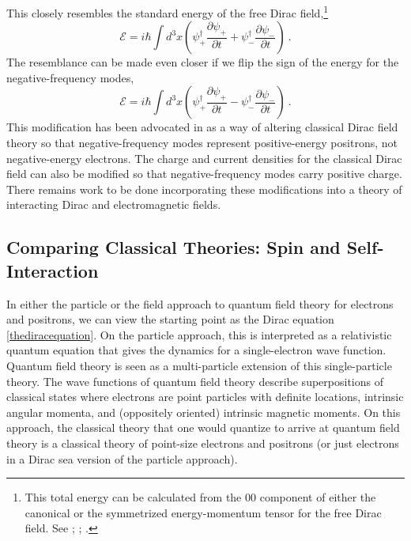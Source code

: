 \documentclass[onecolumn,secnumarabic,amsmath,amssymb,balancelastpage,nofootinbib,12pt]{article}
\begin{document}
This closely resembles the standard energy of the free Dirac field,\footnote{This total energy can be calculated from the $00$ component of either the canonical or the symmetrized energy-momentum tensor for the free Dirac field.  See \citet[pg.\ 419]{heitler}; \citet[pg.\ 219]{schweberQFT}; \citet[eq.\ 3]{positrons}.}
\begin{equation}
\mathcal{E}=i\hbar \int d^3x\left(\psi_+^{\dagger}\frac{\partial \psi_+}{\partial t}+\psi_-^{\dagger}\frac{\partial \psi_-}{\partial t}\right)
\ .
\end{equation}
The resemblance can be made even closer if we flip the sign of the energy for the negative-frequency modes,
\begin{equation}
\mathcal{E}=i\hbar \int d^3x\left(\psi_+^{\dagger}\frac{\partial \psi_+}{\partial t}-\psi_-^{\dagger}\frac{\partial \psi_-}{\partial t}\right)
\ .
\end{equation}
This modification has been advocated in \citet{positrons} as a way of altering classical Dirac field theory so that negative-frequency modes represent positive-energy positrons, not negative-energy electrons.  The charge and current densities for the classical Dirac field can also be modified so that negative-frequency modes carry positive charge.  There remains work to be done incorporating these modifications into a theory of interacting Dirac and electromagnetic fields.



\subsection{Comparing Classical Theories: Spin and Self-Interaction}\label{CLASSICALsection}

In either the particle or the field approach to quantum field theory for electrons and positrons, we can view the starting point as the Dirac equation \eqref{thediracequation}.  On the particle approach, this is interpreted as a relativistic quantum equation that gives the dynamics for a single-electron wave function.  Quantum field theory is seen as a multi-particle extension of this single-particle theory.  The wave functions of quantum field theory describe superpositions of classical states where electrons are point particles with definite locations, intrinsic angular momenta, and (oppositely oriented) intrinsic magnetic moments.  On this approach, the classical theory that one would quantize to arrive at quantum field theory is a classical theory of point-size electrons and positrons (or just electrons in a Dirac sea version of the particle approach).
\end{document}
